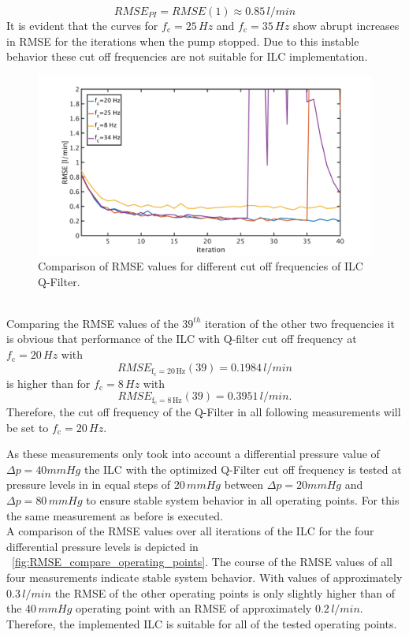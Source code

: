 \begin{equation}
  RMSE_{PI}=RMSE(1)\approx 0.85\,l/min
\end{equation}
It is evident that the curves for $f_{\mathrm{c}}=25\,Hz$ and $f_{\mathrm{c}}=35\,Hz$ show abrupt increases in RMSE for the iterations when the pump stopped. Due to this instable behavior these cut off frequencies are not suitable for ILC implementation.
\begin{figure}[ht]
  \centering
  \includegraphics[width=\textwidth]{images/chapt_5/ILC/RMSE_compare_ILC3_fc.pdf}
  \caption[Comparison of RMSE values for different cut off frequencies of ILC Q-Filter]{Comparison of RMSE values for different cut off frequencies of ILC Q-Filter.}
  \label{fig:RMSE_compare_ILC3_fc}
\end{figure}
\\Comparing the RMSE values of the $39^{th}$ iteration of the other two frequencies it is obvious that performance of the ILC with Q-filter cut off frequency at $f_{\mathrm{c}}=20\,Hz$ with
\begin{equation}
  RMSE_{\mathrm{f_{\mathrm{c}}=20\,Hz}}(39)=0.1984\,l/min
\end{equation}
is higher than for $f_{\mathrm{c}}=8\,Hz$ with
\begin{equation}
  RMSE_{\mathrm{f_{\mathrm{c}}=8\,Hz}}(39)=0.3951\,l/min.
\end{equation}
Therefore, the cut off frequency of the Q-Filter in all following measurements will be set to $f_{\mathrm{c}}=20\,Hz$.

As these measurements only took into account a differential pressure value of $\Delta{p}=40mmHg$ the ILC with the optimized Q-Filter cut off frequency is tested at pressure levels in in equal steps of $20\,mmHg$ between $\Delta{p}=20mmHg$ and $\Delta{p}=80\,mmHg$ to ensure stable system behavior in all operating points. For this the same measurement as before is executed.
\\A comparison of the RMSE values over all iterations of the ILC for the four differential pressure levels is depicted in \figurename~\ref{fig:RMSE_compare_operating_points}. The course of the RMSE values of all four measurements indicate stable system behavior. With values of approximately $0.3\, l/min$ the RMSE of the other operating points is only slightly higher than of the $40\,mmHg$ operating point with an RMSE of approximately $0.2\,l/min$. Therefore, the implemented ILC is suitable for all of the tested operating points.

